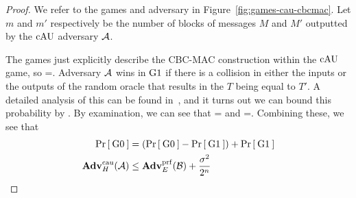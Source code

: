 \begin{proof}
	We refer to the games and adversary in Figure~\ref{fig:games-cau-cbcmac}. Let $m$ and $m'$ respectively be the number of blocks of messages $M$ and $M'$ outputted by the $\textnormal{cAU}$ adversary ${\mathcal A}$. 
	
	The games just explicitly describe the CBC-MAC construction within the $\textnormal{cAU}$ game, so 
	\bnm
	=\;.
	\enm
	Adversary ${\mathcal A}$ wins in ${{\textnormal G}}1$ if there is a collision in either the inputs or the outputs of the random oracle that results in the $T$ being equal to $T'$. A detailed analysis of this can be found in~\cite{black2000cbc}, and it turns out we can bound this probability by 
	\bnm
	\leq {}\;.
	\enm
	By examination, we can see that 
	\bnm
	=
	\enm
	and
	\bnm
	=\;.
	\enm
	Combining these, we see that 
	\begin{align*}
	\Pr\left[\: {{\textnormal G}}0 \:\right]&=(\Pr\left[\: {{\textnormal G}}0 \:\right]-\Pr\left[\: {{\textnormal G}}1 \:\right]) + \Pr\left[\: {{\textnormal G}}1 \:\right]\\
	\mathbf{Adv}^{\mathrm{cau}}_{H}({\mathcal A})&\leq \mathbf{Adv}^{\mathrm{prf}}_{E}({\mathcal B}) + \frac{\sigma^2}{2^n}
	\end{align*}
\end{proof}

